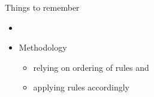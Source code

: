 \begin{frame}{Things to remember}
  \bigskip
  \begin{itemize}
  \item {}
    \medskip
  \item Methodology
  \begin{itemize}\normalsize
  \item relying on ordering of rules and
  \item applying rules accordingly
  \end{itemize}
  \end{itemize}
\end{frame}
%

